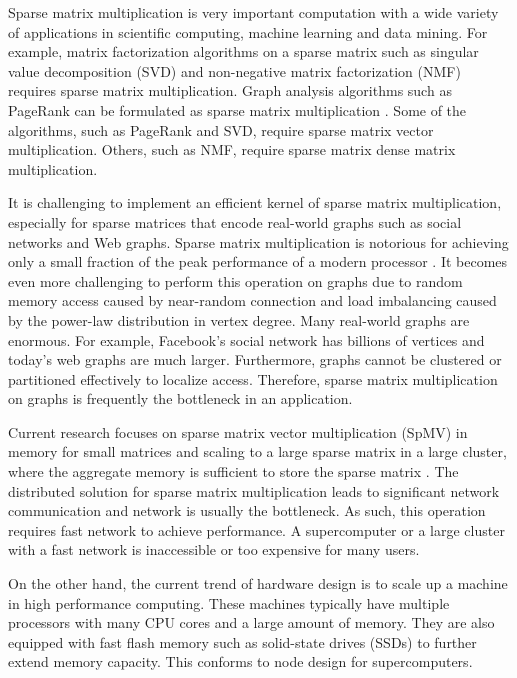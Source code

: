 Sparse matrix multiplication is very important computation with a wide variety
of applications in scientific computing, machine learning and data mining.
For example, matrix factorization algorithms on a sparse matrix such as
singular value decomposition (SVD) \cite{svd} and non-negative matrix
factorization (NMF) \cite{nmf} requires sparse matrix multiplication.
Graph analysis algorithms such as PageRank \cite{pagerank} can be
formulated as sparse matrix multiplication \cite{Mattson13}. Some of
the algorithms, such as PageRank and SVD, require sparse matrix vector
multiplication. Others, such as NMF, require sparse matrix dense
matrix multiplication.


It is challenging to implement an efficient kernel of sparse matrix
multiplication, especially for sparse matrices that encode real-world graphs
such as social networks
and Web graphs. Sparse matrix multiplication is notorious for achieving only
a small fraction of the peak performance of a modern processor \cite{Williams07}.
It becomes even more challenging to perform this operation on graphs due to
random memory access caused by near-random connection and load imbalancing
caused by the power-law distribution in vertex degree. Many real-world graphs
are enormous. For example, Facebook's social network has billions of vertices
and today's web graphs are much larger. Furthermore, graphs cannot be
clustered or partitioned effectively \cite{leskovec} to localize access.
Therefore, sparse matrix multiplication on graphs is frequently the bottleneck
in an application.

Current research focuses on sparse matrix vector multiplication (SpMV) in memory
for small matrices and scaling to a large sparse matrix in a large cluster,
where the aggregate memory is sufficient to store the sparse matrix
\cite{Williams07, Yoo11, Boman2013}.
The distributed solution for sparse matrix multiplication leads to significant
network communication and network is usually the bottleneck.
As such, this operation requires fast network to achieve performance.
A supercomputer or a large cluster with a fast network is inaccessible or
too expensive for many users.



On the other hand, the current trend of hardware design is to scale up
a machine in high performance computing.
These machines typically have multiple processors with many CPU cores and
a large amount of memory. They are also equipped with fast flash
memory such as solid-state drives (SSDs) to further extend memory capacity.
This conforms to node design for supercomputers.

